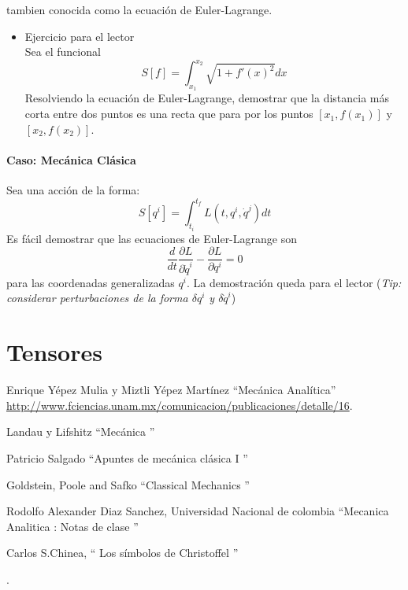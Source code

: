 \documentclass[12pt]{report}
\begin{document}
tambien conocida como la ecuación de Euler-Lagrange.
\begin{itemize}
\item Ejercicio para el lector \\
Sea el funcional
\begin{equation}
S[f]=\int_{x_1}^{x_2}\sqrt{1+f'(x)^2}dx
\end{equation}
Resolviendo la ecuación de Euler-Lagrange, demostrar que la distancia más corta entre dos puntos es una recta que para por los puntos $[x_1,f(x_1)]$ y $[x_2,f(x_2)]$.
\end{itemize}
\subsubsection{Caso: Mecánica Clásica}
Sea una acción de la forma:
\begin{equation}
S[q^i]=\int_{t_i}^{t_f}L(t,q^i,\dot{q}^j)dt
\end{equation}
Es fácil demostrar que las ecuaciones de Euler-Lagrange son
\begin{equation}
\frac{d}{dt}\frac{\partial L}{\partial \dot{q}^i}-\frac{\partial L}{\partial q^i}=0
\end{equation}
para las coordenadas generalizadas $q^i$. La demostración queda para el lector (\textit{Tip: considerar perturbaciones de la forma $\delta q^i$ y $\delta \dot{q}^i$})


\chapter{Tensores}

\newpage

\begin{thebibliography}{99}


\bibitem{} Enrique Yépez Mulia y Miztli Yépez Martínez  ``Mecánica Analítica'' \url{http://www.fciencias.unam.mx/comunicacion/publicaciones/detalle/16}.

\bibitem{} Landau y Lifshitz ``Mecánica '' 

\bibitem{} Patricio Salgado ``Apuntes de mecánica clásica I ''


\bibitem{} Goldstein, Poole and Safko ``Classical Mechanics '' 

\bibitem{} Rodolfo Alexander Diaz Sanchez, Universidad Nacional de colombia  ``Mecanica Analitica : Notas de clase ''

\bibitem{} Carlos S.Chinea, `` Los símbolos de Christoffel ''


\end{thebibliography}.
\end{document}
